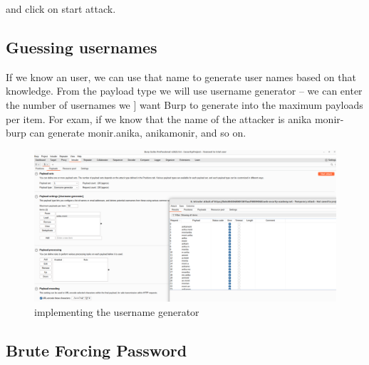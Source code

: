 \documentclass[
	a4paper, %
	12pt, %
]{CSSullivanBusinessReport}
\begin{document}
 

and click on start attack.


\subsection*{Guessing usernames}

\begin{fullwidth}If we know an user, we can use that name to generate user names based on that knowledge. From the payload type we will use username generator – we can enter the number of usernames we ] want Burp to generate into the maximum payloads per item. For exam, if we know that the name of the attacker is anika monir- burp can generate monir.anika, anikamonir,   and so on.
\end{fullwidth}

\begin{figure}[H]
    \centering
    \includegraphics[width=1\textwidth]{Images/anikaScreensots/username.png}
    \caption{implementing the username generator}
    \label{fig:enter-label}
\end{figure}

\subsection*{Brute Forcing Password}
\end{document}
